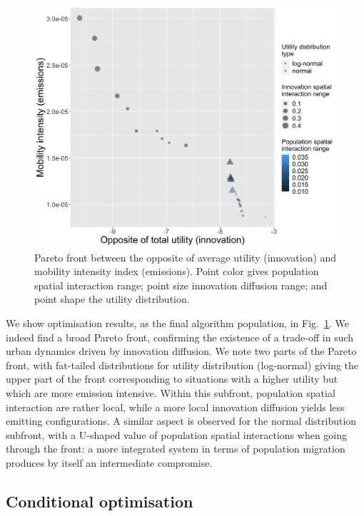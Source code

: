 \documentclass[final,5p,times,twocolumn,authoryear]{elsarticle}
\begin{document}
\begin{figure}
	\centering
	\includegraphics[width=\linewidth]{figures/Fig1.png}
	\caption{Pareto front between the opposite of average utility (innovation) and mobility intensity index (emissions). Point color gives population spatial interaction range; point size innovation diffusion range; and point shape the utility distribution.\label{fig:fig1}}
\end{figure}

We show optimisation results, as the final algorithm population, in Fig.~\ref{fig:fig1}. We indeed find a broad Pareto front, confirming the existence of a trade-off in such urban dynamics driven by innovation diffusion. We note two parts of the Pareto front, with fat-tailed distributions for utility distribution (log-normal) giving the upper part of the front corresponding to situations with a higher utility but which are more emission intensive. Within this subfront, population spatial interaction are rather local, while a more local innovation diffusion yields less emitting configurations. A similar aspect is observed for the normal distribution subfront, with a U-shaped value of population spatial interactions when going through the front: a more integrated system in terms of population migration produces by itself an intermediate compromise.






\subsection{Conditional optimisation}
\end{document}
